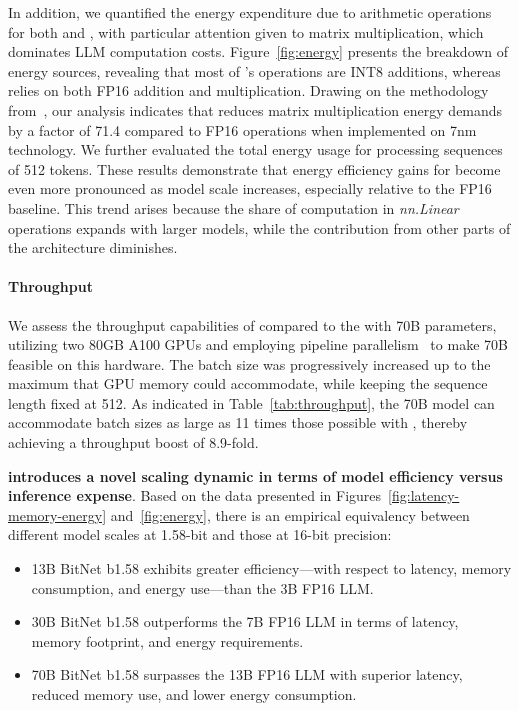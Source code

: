 In addition, we quantified the energy expenditure due to arithmetic operations for both  and , with particular attention given to matrix multiplication, which dominates LLM computation costs. Figure~\ref{fig:energy} presents the breakdown of energy sources, revealing that most of 's operations are INT8 additions, whereas  relies on both FP16 addition and multiplication. Drawing on the methodology from~\cite{energycost, pokebnn}, our analysis indicates that  reduces matrix multiplication energy demands by a factor of 71.4 compared to FP16 operations when implemented on 7nm technology. We further evaluated the total energy usage for processing sequences of 512 tokens. These results demonstrate that energy efficiency gains for  become even more pronounced as model scale increases, especially relative to the FP16  baseline. This trend arises because the share of computation in \emph{nn.Linear} operations expands with larger models, while the contribution from other parts of the architecture diminishes.

\paragraph{Throughput}

We assess the throughput capabilities of  compared to the  with 70B parameters, utilizing two 80GB A100 GPUs and employing pipeline parallelism~\cite{gpipe} to make  70B feasible on this hardware. The batch size was progressively increased up to the maximum that GPU memory could accommodate, while keeping the sequence length fixed at 512. As indicated in Table~\ref{tab:throughput}, the  70B model can accommodate batch sizes as large as 11 times those possible with , thereby achieving a throughput boost of 8.9-fold.

\textbf{ introduces a novel scaling dynamic in terms of model efficiency versus inference expense}. Based on the data presented in Figures~\ref{fig:latency-memory-energy} and~\ref{fig:energy}, there is an empirical equivalency between different model scales at 1.58-bit and those at 16-bit precision:

\begin{itemize}
    \item 13B BitNet b1.58 exhibits greater efficiency—with respect to latency, memory consumption, and energy use—than the 3B FP16 LLM.
    \item 30B BitNet b1.58 outperforms the 7B FP16 LLM in terms of latency, memory footprint, and energy requirements.
    \item 70B BitNet b1.58 surpasses the 13B FP16 LLM with superior latency, reduced memory use, and lower energy consumption.
\end{itemize}

